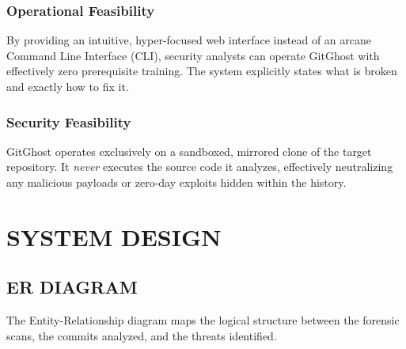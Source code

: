 \documentclass[12pt, a4paper, oneside]{report}
\begin{document}
\subsection{Operational Feasibility}
By providing an intuitive, hyper-focused web interface instead of an arcane Command Line Interface (CLI), security analysts can operate GitGhost with effectively zero prerequisite training. The system explicitly states what is broken and exactly how to fix it.

\subsection{Security Feasibility}
GitGhost operates exclusively on a sandboxed, mirrored clone of the target repository. It \textit{never} executes the source code it analyzes, effectively neutralizing any malicious payloads or zero-day exploits hidden within the history.

\chapter{SYSTEM DESIGN}

\section{ER DIAGRAM}
The Entity-Relationship diagram maps the logical structure between the forensic scans, the commits analyzed, and the threats identified.
\end{document}
